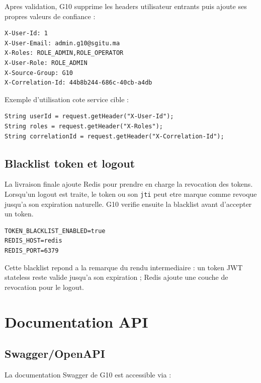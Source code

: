 \documentclass[12pt,a4paper]{article}
\begin{document}
Apres validation, G10 supprime les headers utilisateur entrants puis ajoute ses propres valeurs de confiance :

\begin{lstlisting}[style=code]
X-User-Id: 1
X-User-Email: admin.g10@sgitu.ma
X-Roles: ROLE_ADMIN,ROLE_OPERATOR
X-User-Role: ROLE_ADMIN
X-Source-Group: G10
X-Correlation-Id: 44b8b244-686c-40cb-a4db
\end{lstlisting}

Exemple d'utilisation cote service cible :

\begin{lstlisting}[style=code]
String userId = request.getHeader("X-User-Id");
String roles = request.getHeader("X-Roles");
String correlationId = request.getHeader("X-Correlation-Id");
\end{lstlisting}

\subsection{Blacklist token et logout}

La livraison finale ajoute Redis pour prendre en charge la revocation des tokens. Lorsqu'un logout est traite, le token ou son \texttt{jti} peut etre marque comme revoque jusqu'a son expiration naturelle. G10 verifie ensuite la blacklist avant d'accepter un token.

\begin{lstlisting}[style=code]
TOKEN_BLACKLIST_ENABLED=true
REDIS_HOST=redis
REDIS_PORT=6379
\end{lstlisting}

\begin{infoBox}
Cette blacklist repond a la remarque du rendu intermediaire : un token JWT stateless reste valide jusqu'a son expiration ; Redis ajoute une couche de revocation pour le logout.
\end{infoBox}

\newpage

\section{Documentation API}

\subsection{Swagger/OpenAPI}

La documentation Swagger de G10 est accessible via :
\end{document}
